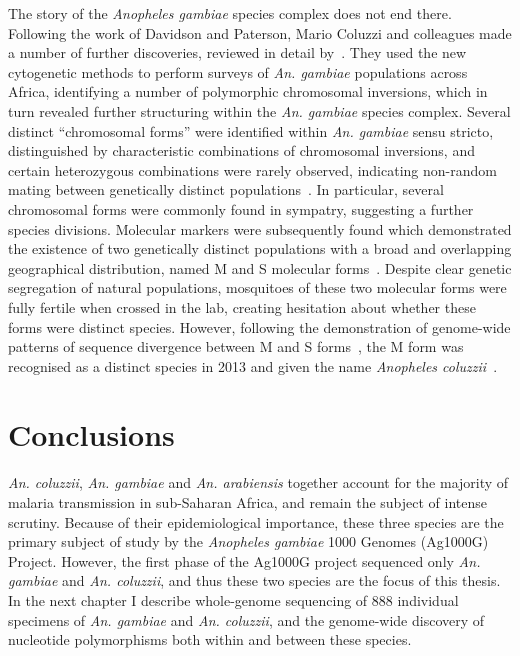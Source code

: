 \documentclass[a4paper,11pt,abstracton,hidelinks]{scrartcl}
\begin{document}
The story of the \textit{Anopheles gambiae} species complex does not end there. 
Following the work of Davidson and Paterson, Mario Coluzzi and colleagues made a number of further discoveries, reviewed in detail by~\textcite{Powell2014}.
%
They used the new cytogenetic methods to perform surveys of \textit{An. gambiae} populations across Africa, identifying a number of polymorphic chromosomal inversions, which in turn revealed further structuring within the \textit{An. gambiae} species complex.
%
Several distinct ``chromosomal forms'' were identified within \textit{An. gambiae} sensu stricto, distinguished by characteristic combinations of chromosomal inversions, and certain heterozygous combinations were rarely observed, indicating non-random mating between genetically distinct populations~\parencite{Toure1998,Coluzzi2002}.
%
In particular, several chromosomal forms were commonly found in sympatry, suggesting a further species divisions.
%
Molecular markers were subsequently found which demonstrated the existence of two genetically distinct populations with a broad and overlapping geographical distribution, named M and S molecular forms~\parencite{dellaTorre2001}.
%
Despite clear genetic segregation of natural populations, mosquitoes of these two molecular forms were fully fertile when crossed in the lab, creating hesitation about whether these forms were distinct species.
%
However, following the  demonstration of genome-wide patterns of sequence divergence between M and S forms~\parencite{Lawniczak2010}, the M form was recognised as a distinct species in 2013 and given the name \textit{Anopheles coluzzii}~\parencite{Coetzee2013}. 


\section{Conclusions}\label{sec:conclusions}


%
\textit{An. coluzzii}, \textit{An. gambiae} and \textit{An. arabiensis} together account for the majority of malaria transmission in sub-Saharan Africa, and remain the subject of intense scrutiny.
%
Because of their epidemiological importance, these three species are the primary subject of study by the \textit{Anopheles gambiae} 1000 Genomes (Ag1000G) Project.
%
However, the first phase of the Ag1000G project sequenced only \textit{An. gambiae} and \textit{An. coluzzii}, and thus these two species are the focus of this thesis.
%
In the next chapter I describe whole-genome sequencing of 888 individual specimens of \textit{An. gambiae} and \textit{An. coluzzii}, and the genome-wide discovery of nucleotide polymorphisms both within and between these species. 
\end{document}
